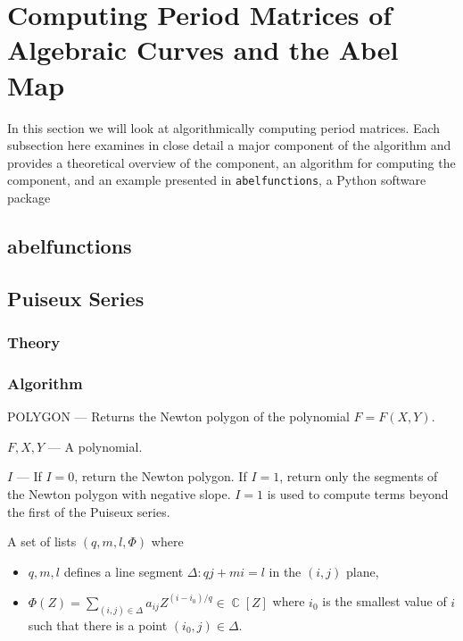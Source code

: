 \documentclass{article}
\newcommand{\Input}{\Require}
\newcommand{\Output}{\Ensure}
\DeclareMathOperator{\CC}{\mathbb{C}}
\begin{document}
\section{Computing Period Matrices of Algebraic Curves and the Abel Map}

In this section we will look at algorithmically computing period
matrices. Each subsection here examines in close detail a major
component of the algorithm and provides a theoretical overview of the
component, an algorithm for computing the component, and an example
presented in {\tt abelfunctions}, a Python software package


\subsection{abelfunctions}

\subsection{Puiseux Series}

%
\subsubsection{Theory}
%

%
\subsubsection{Algorithm}
%

\begin{algorithm}[h]
\caption{POLYGON --- Returns the Newton polygon of the polynomial $F =
  F(X,Y)$.}
\label{alg: puiseux-polygon}
\begin{algorithmic}[1]
\Input

$F,X,Y$ --- A polynomial.

$I$ --- If $I=0$, return the Newton polygon. If $I=1$, return only the
segments of the Newton polygon with negative slope. $I=1$ is used to
compute terms beyond the first of the Puiseux series.

\Output A set of lists $(q,m,l,\Phi)$ where
\begin{itemize}
  \item $q,m,l$ defines a line segment $\Delta: qj+mi=l$ in the $(i,j)$
    plane,
  \item $\Phi(Z) = \sum_{(i,j)\in\Delta} a_{ij} Z^{(i-i_0)/q} \in
    \CC[Z]$ where $i_0$ is the smallest value of $i$ such that there is
    a point $(i_0,j)\in\Delta$.
\end{itemize}

  \State
\EndFunction
\end{algorithmic}
\end{algorithm}
\end{document}
